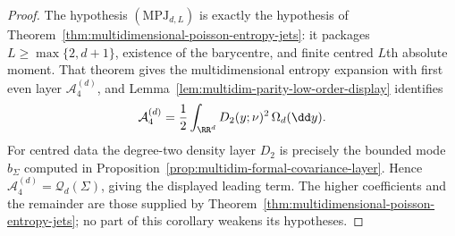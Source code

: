 \begin{proof}
The hypothesis \((\mathrm{MPJ}_{d,L})\) is exactly the hypothesis of
Theorem~\ref{thm:multidimensional-poisson-entropy-jets}: it packages
\(L\ge\max\{2,d+1\}\), existence of the barycentre, and finite centred
\(L\)th absolute moment.  That theorem gives the multidimensional entropy
expansion with first even layer
\(\mathcal A_4^{(d)}\), and
Lemma~\ref{lem:multidim-parity-low-order-display} identifies
\[
\mathcal A_4^{(d)}
=\frac12\int_{\RR^d}D_2(y;\nu)^2\,\Omega_d(\dd y).
\]
For centred data the degree-two density layer \(D_2\) is precisely the bounded
mode \(b_\Sigma\) computed in
Proposition~\ref{prop:multidim-formal-covariance-layer}.  Hence
\(\mathcal A_4^{(d)}=\mathcal Q_d(\Sigma)\), giving the displayed
leading term.  The higher coefficients and the remainder are those supplied by
Theorem~\ref{thm:multidimensional-poisson-entropy-jets}; no part of this
corollary weakens its hypotheses.
\end{proof}

\medskip
{}\label{par:coefficient-evaluability-scope}
\noindent{}
\medskip

